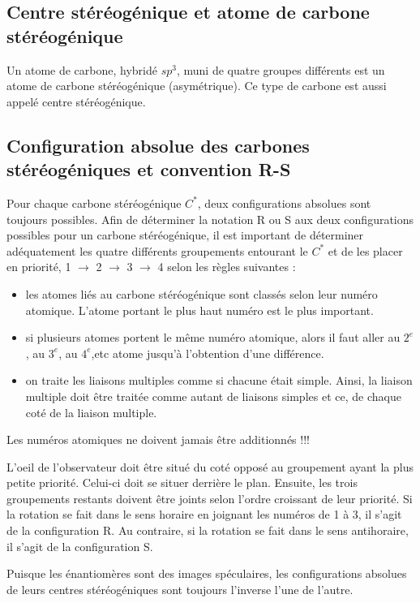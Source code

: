 \subsection{Centre stéréogénique et atome de carbone stéréogénique}Un atome de carbone, hybridé $sp^3$, muni de quatre groupes différents est un atome de carbone stéréogénique (asymétrique).
Ce type de carbone est aussi appelé centre stéréogénique.

\subsection{Configuration absolue des carbones stéréogéniques et convention R-S} Pour chaque carbone stéréogénique $C^*$, deux configurations absolues sont toujours possibles.
Afin de déterminer la notation R ou S aux deux configurations possibles pour un carbone stéréogénique, il est important de déterminer adéquatement les quatre différents groupements entourant le $C^*$ et de les placer en priorité, 1 $\rightarrow$  2 $\rightarrow$ 3 $\rightarrow$ 4 selon les règles suivantes :
\begin{itemize}
  \item les atomes liés au carbone stéréogénique sont classés selon leur numéro atomique.
    L'atome portant le plus haut numéro est le plus important.
  \item si plusieurs atomes portent le même numéro atomique, alors il faut aller au $2^e$, au $3^e$, au $4^e$,etc atome jusqu'à l'obtention d'une différence.
  \item on traite les liaisons multiples comme si chacune était simple.
    Ainsi, la liaison multiple doit être traitée comme autant de liaisons simples et ce, de chaque coté de la liaison multiple.

\end{itemize}

Les numéros atomiques ne doivent jamais être additionnés !!!

L'oeil de l'observateur doit être situé du coté opposé au groupement ayant la plus petite priorité.
Celui-ci doit se situer derrière le plan.
Ensuite, les trois groupements restants doivent être joints selon l'ordre croissant de leur priorité.
Si la rotation se fait dans le sens horaire en joignant les numéros de 1 à 3, il s'agit de la configuration R.
Au contraire, si la rotation se fait dans le sens antihoraire, il s'agit de la configuration S.

Puisque les énantiomères sont des images spéculaires, les configurations absolues de leurs centres stéréogéniques sont toujours l'inverse l'une de l'autre.

